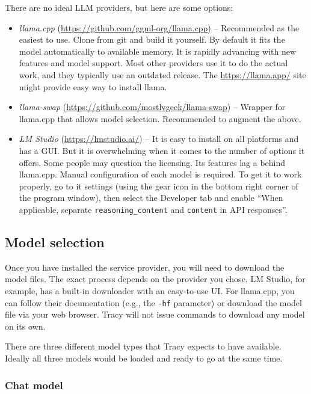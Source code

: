 \documentclass[hidelinks,titlepage,a4paper,twoside]{article}
\begin{document}
There are no ideal LLM providers, but here are some options:

\begin{itemize}
\item \emph{llama.cpp} (\url{https://github.com/ggml-org/llama.cpp}) -- Recommended as the easiest to use. Clone from git and build it yourself. By default it fits the model automatically to available memory. It is rapidly advancing with new features and model support. Most other providers use it to do the actual work, and they typically use an outdated release. The \url{https://llama.app/} site might provide easy way to install llama.
\item \emph{llama-swap} (\url{https://github.com/mostlygeek/llama-swap}) -- Wrapper for llama.cpp that allows model selection. Recommended to augment the above.
\item \emph{LM Studio} (\url{https://lmstudio.ai/}) -- It is easy to install on all platforms and has a GUI. But it is overwhelming when it comes to the number of options it offers. Some people may question the licensing. Its features lag a behind llama.cpp. Manual configuration of each model is required. To get it to work properly, go to it settings (using the gear icon in the bottom right corner of the program window), then select the Developer tab and enable \enquote{When applicable, separate \texttt{reasoning\_content} and \texttt{content} in API responses}.
\end{itemize}

\subsection{Model selection}

Once you have installed the service provider, you will need to download the model files. The exact process depends on the provider you chose. LM Studio, for example, has a built-in downloader with an easy-to-use UI. For llama.cpp, you can follow their documentation (e.g., the \texttt{-hf} parameter) or download the model file via your web browser. Tracy will not issue commands to download any model on its own.

There are three different model types that Tracy expects to have available. Ideally all three models would be loaded and ready to go at the same time.

\subsubsection{Chat model}
\end{document}
